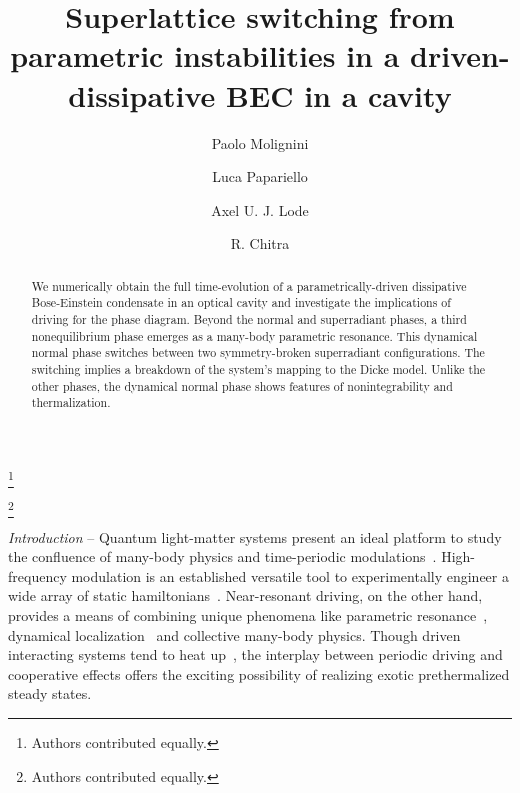 \documentclass[aps,prl,twocolumn,superscriptaddress,groupedaddress]{revtex4}  %
\begin{document}
\preprint{}

\title{Superlattice switching from parametric instabilities in a driven-dissipative BEC in a cavity}
%
\author{Paolo Molignini}
\thanks{Authors contributed equally.}
\author{Luca Papariello}
\thanks{Authors contributed equally.}
\author{Axel U. J. Lode}
\author{R. Chitra}
%

\begin{abstract}
We numerically obtain the full time-evolution of a parametrically-driven dissipative Bose-Einstein
condensate in an optical cavity and investigate the implications of driving for the phase diagram.
Beyond the normal and superradiant phases, a third nonequilibrium phase emerges as a many-body
parametric resonance. This dynamical normal phase switches between two symmetry-broken
superradiant configurations. The switching implies a breakdown of the system's mapping to
the Dicke model. Unlike the other phases, the dynamical normal phase shows features of nonintegrability and thermalization.   
\end{abstract}






\maketitle



\textit{Introduction} -- 
Quantum light-matter systems  present an ideal platform to study the confluence of  many-body physics and  time-periodic modulations~\cite{Ritter2009, PRLPurdy}. 
High-frequency  modulation  is an established versatile tool to experimentally engineer a wide array of static hamiltonians~\cite{eckardt, PRL_Meinert2016, goldmanPRX}. 
Near-resonant driving, on the other hand, provides a means of combining unique phenomena like parametric resonance~\cite{Landau_Lifshitz}, dynamical 
localization~\cite{Casati, Fishman} and collective many-body physics.   
Though driven interacting systems tend to heat up~\cite{Lazarides, Alessio, Ponte}, the interplay between periodic driving and cooperative effects offers the exciting possibility of realizing  
exotic prethermalized steady states.
\end{document}
